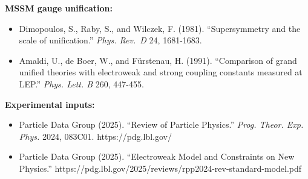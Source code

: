 \documentclass[11pt,a4paper]{article}
\theoremstyle{remark}
\providecommand{\tightlist}{%
  \setlength{\itemsep}{0pt}\setlength{\parskip}{0pt}}
\begin{document}
\textbf{MSSM gauge unification:}

\begin{itemize}
\tightlist
\item
  Dimopoulos, S., Raby, S., and Wilczek, F. (1981). ``Supersymmetry and the
  scale of unification.'' \emph{Phys. Rev.~D} 24, 1681-1683.
\item
  Amaldi, U., de Boer, W., and Fürstenau, H. (1991). ``Comparison of grand
  unified theories with electroweak and strong coupling constants measured
  at LEP.'' \emph{Phys. Lett. B} 260, 447-455.
\end{itemize}

\textbf{Experimental inputs:}

\begin{itemize}
\tightlist
\item
  Particle Data Group (2025). ``Review of Particle Physics.'' \emph{Prog. Theor.
  Exp. Phys.} 2024, 083C01. https://pdg.lbl.gov/
\item
  Particle Data Group (2025). ``Electroweak Model and Constraints on New
  Physics.'' https://pdg.lbl.gov/2025/reviews/rpp2024-rev-standard-model.pdf
\end{itemize}
\end{document}
